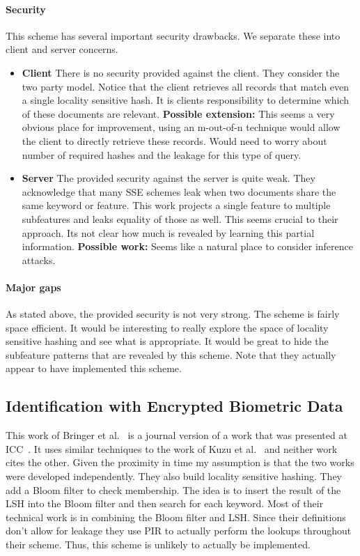 \documentclass[11pt]{article}
\theoremstyle{remark}
\begin{document}
\paragraph{Security}  This scheme has several important security drawbacks.  We separate these into client and server concerns.

\begin{itemize}
\item \textbf{Client} There is no security provided against the client.  They consider the two party model.  Notice that the client retrieves all records that match even a single locality sensitive hash.  It is clients responsibility to determine which of these documents are relevant.  \textbf{Possible extension:} This seems a very obvious place for improvement, using an m-out-of-n technique would allow the client to directly retrieve these records.  Would need to worry about number of required hashes and the leakage for this type of query.
\item \textbf{Server} The provided security against the server is quite weak.  They acknowledge that many SSE schemes leak when two documents share the same keyword or feature.  This work projects a single feature to multiple subfeatures and leaks equality of those as well.  This seems crucial to their approach.  Its not clear how much is revealed by learning this partial information.  \textbf{Possible work:} Seems like a natural place to consider inference attacks.
\end{itemize}

\paragraph{Major gaps} As stated above, the provided security is not very strong.  The scheme is fairly space efficient.  It would be interesting to really explore the space of locality sensitive hashing and see what is appropriate.  It would be great to hide the subfeature patterns that are revealed by this scheme.  Note that they actually appear to have implemented this scheme.

\subsection{Identification with Encrypted Biometric Data}
This work of Bringer et al.~\cite{bringer2011identification} is a journal version of a work that was presented at ICC~\cite{bringer2009error}.  It uses similar techniques to the work of Kuzu et al.~\cite{kuzu2012efficient} and neither work cites the other.  Given the proximity in time my assumption is that the two works were developed independently.  They also build locality sensitive hashing.  They add a Bloom filter to check membership.  The idea is to insert the result of the LSH into the Bloom filter and then search for each keyword.  Most of their technical work is in combining the Bloom filter and LSH.  Since their definitions don't allow for leakage they use PIR to actually perform the lookups throughout their scheme.  Thus, this scheme is unlikely to actually be implemented.
\end{document}
